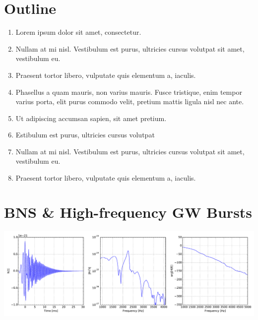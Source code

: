\documentclass[a0,landscape]{a0poster}
\begin{document}
\begin{multicols}{4}



\color{DarkSlateGray} %

\section*{\centering Outline}

\begin{enumerate}
\item Lorem ipsum dolor sit amet, consectetur.
\item Nullam at mi nisl. Vestibulum est purus, ultricies cursus volutpat sit amet, vestibulum eu.
\item Praesent tortor libero, vulputate quis elementum a, iaculis.
\item Phasellus a quam mauris, non varius mauris. Fusce tristique, enim tempor varius porta, elit purus commodo velit, pretium mattis ligula nisl nec ante.
\item Ut adipiscing accumsan sapien, sit amet pretium.
\item Estibulum est purus, ultricies cursus volutpat
\item Nullam at mi nisl. Vestibulum est purus, ultricies cursus volutpat sit amet, vestibulum eu.
\item Praesent tortor libero, vulputate quis elementum a, iaculis.
\end{enumerate}


\section*{\centering BNS \& High-frequency GW Bursts}

\begin{center}%
    \includegraphics[width=\linewidth]{example_waveform.pdf}%
\end{center}%



\end{multicols}
\end{document}
